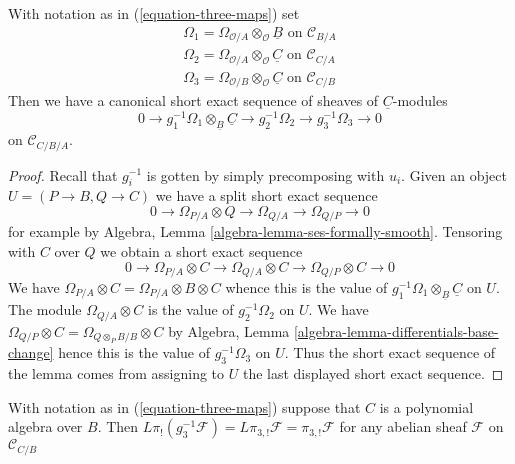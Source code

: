 \begin{lemma}
\label{lemma-triangle-ses}
With notation as in (\ref{equation-three-maps}) set
$$
\begin{matrix}
\Omega_1 = \Omega_{\mathcal{O}/A} \otimes_\mathcal{O} \underline{B}
\text{ on }\mathcal{C}_{B/A} \\
\Omega_2 = \Omega_{\mathcal{O}/A} \otimes_\mathcal{O} \underline{C}
\text{ on }\mathcal{C}_{C/A} \\
\Omega_3 = \Omega_{\mathcal{O}/B} \otimes_\mathcal{O} \underline{C}
\text{ on }\mathcal{C}_{C/B}
\end{matrix}
$$
Then we have a canonical short exact sequence of sheaves
of $\underline{C}$-modules
$$
0 \to g_1^{-1}\Omega_1 \otimes_{\underline{B}} \underline{C} \to
g_2^{-1}\Omega_2 \to
g_3^{-1}\Omega_3 \to 0
$$
on $\mathcal{C}_{C/B/A}$.
\end{lemma}

\begin{proof}
Recall that $g_i^{-1}$ is gotten by simply precomposing with $u_i$.
Given an object $U = (P \to B, Q \to C)$ we have a split
short exact sequence
$$
0 \to \Omega_{P/A} \otimes Q \to \Omega_{Q/A} \to \Omega_{Q/P} \to 0
$$
for example by Algebra, Lemma \ref{algebra-lemma-ses-formally-smooth}.
Tensoring with $C$ over $Q$ we obtain a short exact sequence
$$
0 \to \Omega_{P/A} \otimes C \to \Omega_{Q/A} \otimes C \to
\Omega_{Q/P} \otimes C \to 0
$$
We have $\Omega_{P/A} \otimes C = \Omega_{P/A} \otimes B \otimes C$
whence this is the value of
$g_1^{-1}\Omega_1 \otimes_{\underline{B}} \underline{C}$
on $U$. The module $\Omega_{Q/A} \otimes C$ is the value of
$g_2^{-1}\Omega_2$ on $U$.
We have $\Omega_{Q/P} \otimes C = \Omega_{Q \otimes_P B/B} \otimes C$
by Algebra, Lemma \ref{algebra-lemma-differentials-base-change}
hence this is the value of
$g_3^{-1}\Omega_3$ on $U$. Thus the short exact sequence of the
lemma comes from assigning to $U$ the last displayed short exact
sequence.
\end{proof}

\begin{lemma}
\label{lemma-polynomial-on-top}
With notation as in (\ref{equation-three-maps})
suppose that $C$ is a polynomial algebra over $B$. Then
$L\pi_!(g_3^{-1}\mathcal{F}) = L\pi_{3, !}\mathcal{F} = \pi_{3, !}\mathcal{F}$
for any abelian sheaf $\mathcal{F}$ on $\mathcal{C}_{C/B}$
\end{lemma}

